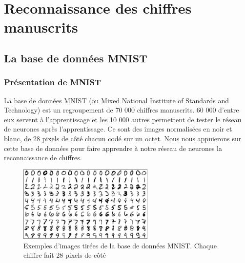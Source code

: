 \chapter{Reconnaissance des chiffres manuscrits}

\section{La base de données MNIST}

\subsection{Présentation de MNIST}
La base de données MNIST (ou Mixed National Institute of Standards and Technology) est un regroupement de 70 000 chiffres manuscrits. 60 000 d'entre eux servent à l'apprentissage et les 10 000 autres permettent de tester le réseau de neurones après l'apprentissage. Ce sont des images normalisées en noir et blanc, de 28 pixels de côté chacun codé sur un octet. Nous nous appuierons sur cette base de données pour faire apprendre à notre réseau de neurones la reconnaissance de chiffres.

\begin{figure}[h]
\begin{center}
\includegraphics[width=0.6\textwidth]{images/mnistExamples.png}\caption{Exemples d'images tirées de la base de données MNIST. Chaque chiffre fait 28 pixels de côté}
\end{center}
\end{figure}

